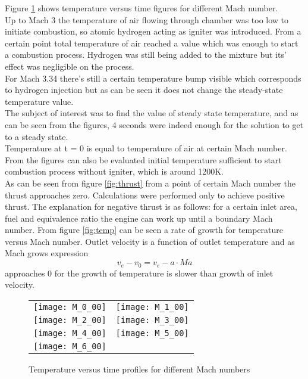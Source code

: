 \documentclass[a4paper, 12pt]{article}
\begin{document}
Figure \ref{fig:time} shows temperature versus time figures for different Mach number.\\

Up to Mach 3 the temperature of air flowing through chamber was too low to initiate combustion, so atomic hydrogen acting as igniter was introduced. From a certain point total temperature of air reached a value which was enough to start a combustion process. Hydrogen was still being added to the mixture but its' effect was negligible on the process.\\

For Mach 3.34 there's still a certain temperature bump visible which corresponds to hydrogen injection but as can be seen it does not change the steady-state temperature value.\\

The subject of interest was to find the value of steady state temperature, and as can be seen from the figures, 4 seconds were indeed enough for the solution to get to a steady state.\\

Temperature at t = 0 is equal to temperature of air at certain Mach number. From the figures can also be evaluated initial temperature sufficient to start combustion process without igniter, which is around 1200K.\\

As can be seen from figure \ref{fig:thrust} from a point of certain Mach number the thrust approaches zero. Calculations were performed only to achieve positive thrust. The explanation for negative thrust is as follows: for a certain inlet area, fuel and equivalence ratio the engine can work up until a boundary Mach number. From figure \ref{fig:temp} can be seen a rate of growth for temperature versus Mach number. Outlet velocity is a function of outlet temperature and as Mach grows expression
\[v_e - v_0 = v_e - a \cdot Ma\]
approaches 0 for the growth of temperature is slower than growth of inlet velocity.\\



\begin{figure}
\begin{tabular}{ll}
\centering
\texttt{[image: M\_0\_00]}
&
\texttt{[image: M\_1\_00]}
\\
\texttt{[image: M\_2\_00]}
&
\texttt{[image: M\_3\_00]}
\\
\texttt{[image: M\_4\_00]}
&
\texttt{[image: M\_5\_00]}
\\
\texttt{[image: M\_6\_00]}


\end{tabular}
\caption{Temperature versus time profiles for different Mach numbers}
\label{fig:time} 
\end{figure}
\end{document}
